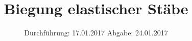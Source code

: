 

\subject{V103}
\title{Biegung elastischer Stäbe}
\date{
	\centering
	Durchführung: 17.01.2017
	\hspace{3em}
	Abgabe: 24.01.2017
}



\maketitle
\thispagestyle{empty}
\tableofcontents
\newpage








\printbibliography


